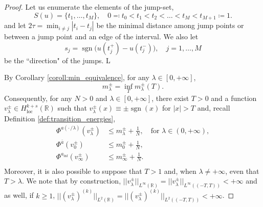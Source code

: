 \documentclass{article}
\theoremstyle{definition}
\newcommand{\abs}[1]{\left|#1\right|}
\newcommand{\R}{\mathbb{R}}
\newcommand{\sgn}{\operatorname{sgn}}
\begin{document}
\begin{proof}
    Let us enumerate the elements of the jump-set,
    \[S(u)= \{t_1,\dots, t_M\},  \quad 0\eqqcolon t_0< t_1<t_2<\ldots<t_M<t_{M+1}\coloneqq 1.\] 
    and let  $2\displaystyle\tau=\min_{i\ne j}|t_i-t_j|$ be the minimal distance among jump points or between a jump point and an edge of the interval. We also let
    \[s_j = \sgn\big(u(t_j^+)- u(t_j^-)\big),\quad j=1,\ldots, M\] 
        be the ``direction" of the jumps. L
        
    By Corollary \ref{coroll:min_equivalence}, for any $\lambda\in [0,+\infty]$, \[m^\pm_{\lambda} = \inf_T m^\pm_{\lambda}(T).\]    
   Consequently, for any $N>0$ and $\lambda\in [0,+\infty]$, there exist $T>0$ and a function $v^\pm_\lambda\in H^{k+s}_{\operatorname{loc}}(\R)$ such that $v^\pm_\lambda(x) \equiv \pm\sgn(x)$ for $\abs{x}>T$ and, recall Definition \ref{def:transition_energies},
    \begin{equation}\label{eq:approx_choice}
       \begin{split}
            \Phi^{a(\cdot\,/\lambda)}(v^\pm_\lambda) &\leq m_\lambda^{\pm} + \frac{1}{N}, \quad \text{for }\lambda\in (0,+\infty),\\
             \Phi^{\bar a}(v^\pm_0) &\leq m_0^{\pm} + \frac{1}{N},\\
              \Phi^{a_{\inf}}(v^\pm_\infty) &\leq m_\infty^{\pm} + \frac{1}{N}.\\
       \end{split}
    \end{equation} 
    Moreover, it is also possible to suppose that $T>1$ and, when $\lambda \ne +\infty$, even that $T>\lambda$.
    We note that by construction, $||v^\pm_\lambda||_{L^\infty(\R)} =  ||v^\pm_\lambda||_{L^\infty((-T,T))}<+\infty$ and as well, if $k\geq 1$, $||(v^\pm_\lambda)^{(k)}||_{L^2(\R)} = ||(v^\pm_\lambda)^{(k)}||_{L^2((-T,T))}<+\infty$.


\end{proof}
\end{document}
